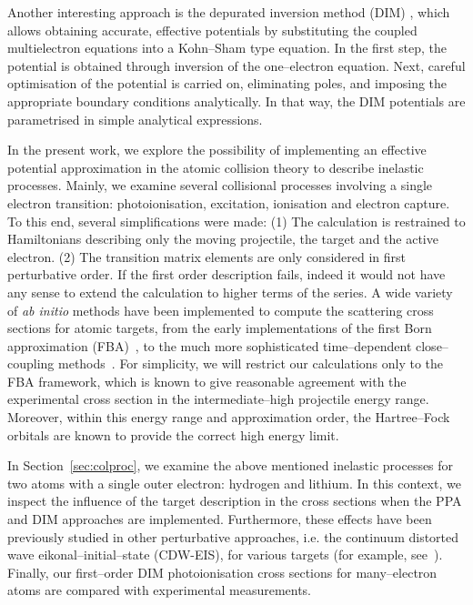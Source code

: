 \documentclass[10pt]{article}
\begin{document}
Another interesting approach is the depurated inversion method 
(DIM) \cite{Mendez2015,Mendez2016,Mendez2018}, which allows
obtaining accurate, effective potentials by substituting the coupled 
multielectron equations into a Kohn--Sham type equation. 
In the first step, the potential is obtained through inversion of the 
one--electron equation. Next, careful optimisation of the potential is 
carried on, eliminating poles, and imposing the appropriate boundary 
conditions analytically. In that way, the DIM potentials are parametrised 
in simple analytical expressions.

In the present work, we explore the possibility of implementing an 
effective potential approximation in the atomic collision theory to 
describe inelastic processes. Mainly, we examine several collisional 
processes involving 
a single electron transition: photoionisation, excitation, ionisation 
and electron capture. To this end, several simplifications were made: 
(1) The calculation is restrained to Hamiltonians describing only
the moving projectile, the target and the active 
electron. (2) The transition matrix elements are only considered in  
first perturbative order. If the first order description fails, 
indeed it would not have any sense to extend the calculation to 
higher terms of the series.
A wide variety of {\it ab initio} methods have been 
implemented to compute the scattering cross sections for atomic targets, 
from the early implementations of the first Born 
approximation (FBA)~\cite{BatesBook,McDowell1961}, to the much 
more sophisticated time--dependent close--coupling 
methods~\cite{LeePindzola2011,Pindzola2016}. For simplicity, we will 
restrict our calculations only to the FBA framework, 
which is known to give reasonable agreement with 
the experimental cross section in the intermediate--high projectile 
energy range. Moreover, within this energy range and approximation 
order, the Hartree--Fock orbitals are known to provide the correct 
high energy limit.

In Section~\ref{sec:colproc}, we examine the above mentioned 
inelastic processes for two atoms with a single outer electron: 
hydrogen and lithium. 
In this context, we inspect the influence of the target description 
in the cross sections when the PPA and DIM approaches are implemented. 
Furthermore, these effects have been previously studied in other 
perturbative approaches, i.e. the continuum distorted wave 
eikonal--initial--state (CDW-EIS), for various targets (for example,
see~\cite{Kirchner1998,Fiori2001}).
Finally, our first--order DIM photoionisation cross sections for 
many--electron atoms are compared with experimental measurements. 
\end{document}
